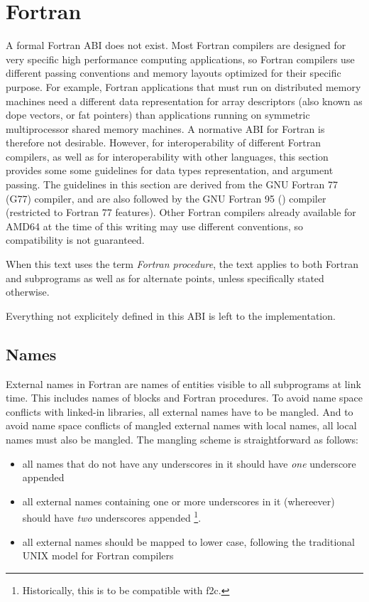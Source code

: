 \section{Fortran}

A formal Fortran ABI does not exist.  Most Fortran compilers are
designed for very specific high performance computing applications, so
Fortran compilers use different passing conventions and memory layouts
optimized for their specific purpose.  For example, Fortran
applications that must run on distributed memory machines need a
different data representation for array descriptors (also known as
dope vectors, or fat pointers) than applications running on symmetric
multiprocessor shared memory machines.  A normative ABI for Fortran is
therefore not desirable.  However, for interoperability of different
Fortran compilers, as well as for interoperability with other
languages, this section provides some some guidelines for data types
representation, and argument passing.  The guidelines in this section
are derived from the GNU Fortran 77 (G77) compiler, and are also
followed by the GNU Fortran 95 () compiler (restricted to
Fortran 77 features).  Other Fortran
compilers already available for AMD64 at the time of this writing may
use different conventions, so compatibility is not guaranteed.

When this text uses the term {\em Fortran procedure}, the text applies
to both Fortran  and  subprograms as
well as for alternate  points,
unless specifically stated otherwise.

Everything not explicitely defined in this ABI is left to the implementation.

\subsection{Names}
\label{sub_fortran_names}

External names in Fortran are names of entities visible to all
subprograms at link time.  This includes names of  blocks
and Fortran procedures.
To avoid name space conflicts with linked-in libraries, all external
names have to be mangled.  And to avoid name space conflicts
of mangled external names with local names, all local names must also
be mangled.
The mangling scheme is straightforward as follows:
\begin{itemize}
\item all names that do not have any underscores in it should have
{\em one} underscore appended
\item all external names containing one or
   more underscores in it (whereever) should have {\em two} underscores
   appended \footnote{Historically, this is to be compatible with f2c.}.
\item all external names should be mapped to lower case,
   following the traditional UNIX model for Fortran compilers
\end{itemize}


